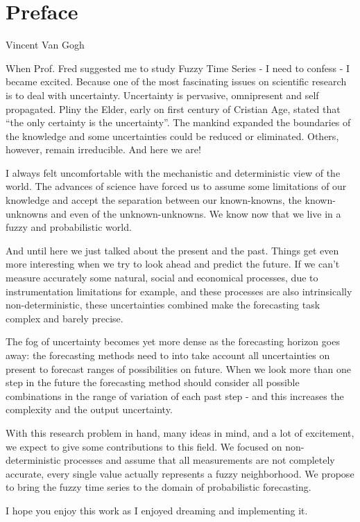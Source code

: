 \chapter*[Preface]{Preface} 

{Vincent Van Gogh}

When Prof. Fred suggested me to study Fuzzy Time Series - I need to confess - I became excited. Because one of the most fascinating issues on scientific research is to deal with uncertainty. Uncertainty is pervasive, omnipresent and self propagated. Pliny the Elder, early on first century of Cristian Age, stated that ``the only certainty is the uncertainty''. The mankind expanded the boundaries of the knowledge and some uncertainties could be reduced or eliminated. Others, however, remain irreducible. And here we are!

I always felt uncomfortable with the mechanistic and deterministic view of the world. The advances of science have forced us to assume some limitations of our knowledge and accept the separation between our known-knowns, the known-unknowns and even of the unknown-unknowns. We know now that we live in a fuzzy and probabilistic world. 

And until here we just talked about the present and the past. Things get even more interesting when we try to look ahead and predict the future. If we can't measure accurately some natural, social and economical processes, due to instrumentation limitations for example, and these processes are also  intrinsically non-deterministic, these uncertainties combined make the forecasting task complex and barely precise.

The fog of uncertainty becomes yet more dense as the forecasting horizon goes away: the forecasting methods need to into take account all uncertainties on present to forecast ranges of possibilities on future. When we look more than one step in the future the forecasting method should consider all possible combinations in the range of variation of each past step - and this increases the complexity and the output uncertainty.

With this research problem in hand, many ideas in mind, and a lot of excitement, we expect to give some contributions to this field. We focused on non-deterministic processes and assume that all measurements are not completely accurate, every single value actually represents a fuzzy neighborhood. We propose to bring the fuzzy time series to the domain of probabilistic forecasting. 

I hope you enjoy this work as I enjoyed dreaming and implementing it. 
